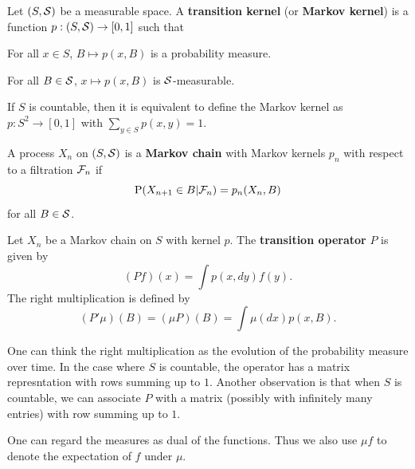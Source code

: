 \begin{definition}
    Let $(S, \S)$ be a measurable space. A \textbf{transition kernel} 
    (or \textbf{Markov kernel}) is a function $p:(S,\S)\to[0,1]$ such that 
    \begin{thmenum}
        \item For all $x\in S$, $B\mapsto p(x, B)$ is a probability measure. 
        \item For all $B\in\S$, $x\mapsto p(x, B)$ is $\S$-measurable. 
    \end{thmenum}
\end{definition}
\begin{remark}
    If $S$ is countable, then it is equivalent to define the Markov kernel 
    as $p:S^2\to [0,1]$ with $\sum_{y\in S}p(x,y) = 1$. 
\end{remark}

\begin{definition}
    A process $X_n$ on $(S,\S)$ is a \textbf{Markov chain} 
    with Markov kernels $p_n$ with respect to a filtration $\F_n$ if 
    \begin{equation*}
        \P(X_{n+1}\in B|\F_n) = p_n(X_n, B)
    \end{equation*}
    for all $B\in\S$. 
\end{definition}

\begin{definition}
    Let $X_n$ be a Markov chain on $S$ with kernel $p$. The \textbf{transition 
    operator} $P$ is given by 
    \begin{equation*}
        (Pf)(x) = \int p(x,dy)f(y).
    \end{equation*} 
    The right multiplication is defined by 
    \begin{equation*}
        (P'\mu)(B) = (\mu P)(B) = \int \mu(dx)p(x,B).
    \end{equation*}
\end{definition}
\begin{remark}
    One can think the right multiplication as the evolution of the 
    probability measure over time. In the case where $S$ is 
    countable, the operator has a matrix represntation with 
    rows summing up to $1$. Another observation is that when $S$ is 
    countable, we can associate $P$ with a matrix (possibly with infinitely 
    many entries) with row summing up to $1$. 
\end{remark}
\begin{remark}
    One can regard the measures as dual of the functions. Thus we also 
    use $\mu f$ to denote the expectation of $f$ under $\mu$. 
\end{remark}

